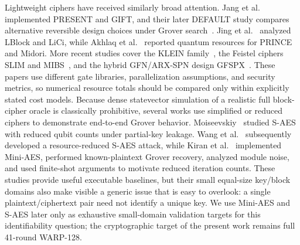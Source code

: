 \documentclass[10pt,a4paper]{article}
\begin{document}
Lightweight ciphers have received similarly broad attention. Jang et al.~\cite{Jang2021} implemented PRESENT and GIFT, and their later DEFAULT study compares alternative reversible design choices under Grover search~\cite{JangDefault2025}. Jing et al.~\cite{Jing2023} analyzed LBlock and LiCi, while Akhlaq et al.~\cite{Akhlaq2024} reported quantum resources for PRINCE and Midori. More recent studies cover the KLEIN family~\cite{KLEIN2026}, the Feistel ciphers SLIM and MIBS~\cite{SLIM2025,MIBS2026}, and the hybrid GFN/ARX-SPN design GFSPX~\cite{Ulgen2026}. These papers use different gate libraries, parallelization assumptions, and security metrics, so numerical resource totals should be compared only within explicitly stated cost models.
Because dense statevector simulation of a realistic full block-cipher oracle is classically prohibitive, several works use simplified or reduced ciphers to demonstrate end-to-end Grover behavior. Moiseevskiy~\cite{Moiseevskiy2023} studied S-AES with reduced qubit counts under partial-key leakage. Wang et al.~\cite{Wang2025} subsequently developed a resource-reduced S-AES attack, while Kiran et al.~\cite{Kiran2026} implemented Mini-AES, performed known-plaintext Grover recovery, analyzed module noise, and used finite-shot arguments to motivate reduced iteration counts.  These studies provide useful executable baselines, but their small equal-size key/block domains also make visible a generic issue that is easy to overlook: a single plaintext/ciphertext pair need not identify a unique key.  We use Mini-AES and S-AES later only as exhaustive small-domain validation targets for this identifiability question; the cryptographic target of the present work remains full 41-round WARP-128.
\end{document}
